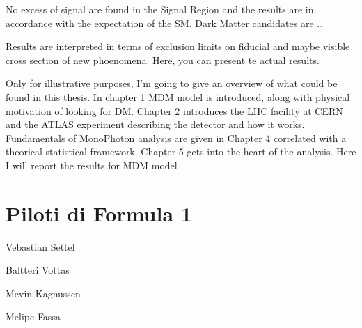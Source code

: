 {  No excess of signal are found in the Signal Region and the results are in accordance with the expectation of the SM. 
  Dark Matter candidates are \dots

  Results are interpreted in terms of exclusion limits on fiducial and maybe visible cross section of new phoenomena. Here, you can present te actual results.
  
  Only for illustrative purposes, I'm going to give an overview of what could be found in this thesis. In chapter 1 MDM model is introduced, along with physical motivation of looking for DM. Chapter 2 introduces the LHC facility at CERN and the ATLAS experiment describing the detector and how it works. Fundamentals of MonoPhoton analysis are given in Chapter 4 correlated with a theorical statistical framework. Chapter 5 gets into the heart of the analysis. Here I will report the results for MDM model %

}
{\mainmatter
\chapter{Piloti di Formula 1}
Vebastian Settel

Baltteri Vottas

Mevin Kagnussen

Melipe Fassa
}
